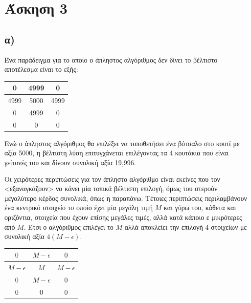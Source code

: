 \documentclass[11pt,a4paper]{book}
\begin{document}
\section*{Άσκηση 3}
\subsection*{α)}
Ένα παράδειγμα για το οποίο ο άπληστος αλγόριθμος δεν δίνει το βέλτιστο αποτέλεσμα είναι το εξής:

\vspace{3mm}
\begin{doublespace}
\begin{tabular}{|c|c|c|}
	\hline
	0    & 4999 & 0    \\ \hline
	4999 & 5000 & 4999 \\ \hline
	0    & 4999 & 0    \\ \hline
	0    &    0 & 0    \\ \hline
\end{tabular}
\end{doublespace}
\vspace{3mm}

Ενώ ο άπληστος αλγόριθμος θα επιλέξει να τοποθετήσει ένα βότσαλο
στο κουτί με αξία 5000, η βέλτιστη λύση επιτυγχάνεται επιλέγοντας
τα 4 κουτάκια που είναι γείτονές του και δίνουν συνολική αξία 19,996.

Οι χειρότερες περιπτώσεις για τον άπληστο αλγόριθμο είναι εκείνες που τον <εξαναγκάζουν> να κάνει μία τοπικά βέλτιστη επιλογή, όμως του στερούν μεγαλύτερο κέρδος συνολικά, όπως η παραπάνω. Τέτοιες περιπτώσεις περιλαμβάνουν ένα κεντρικό στοιχείο το οποίο έχει μία μεγάλη τιμή $M$ και γύρω του, κάθετα και οριζόντια, στοιχεία που έχουν επίσης μεγάλες τιμές, αλλά κατά κάποιο ε μικρότερες από $M$. Έτσι ο αλγόριθμος επιλέγει το $M$ αλλά αποκλείει την επιλογή 4 στοιχείων με συνολική αξία $4(M - \epsilon)$.

\vspace{3mm}
\begin{doublespace}
\begin{tabular}{|c|c|c|}
	\hline
	$0$            & $M - \epsilon$ & $0$            \\ \hline
	$M - \epsilon$ & $M$            & $M - \epsilon$ \\ \hline
	$0$            & $M - \epsilon$ & $0$            \\ \hline
	$0$            & $0$            & $0$            \\ \hline
\end{tabular}
\end{doublespace}
\vspace{3mm}
\end{document}
